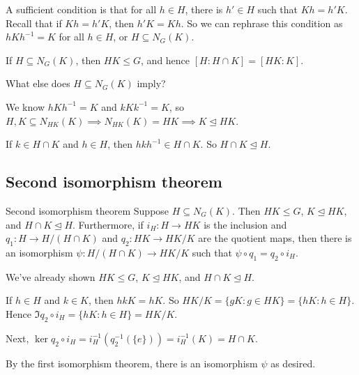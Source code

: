 \documentclass[12pt,letterpaper]{report}
\begin{document}
A sufficient condition is that for all $h \in H$, there is $h' \in H$ such that $Kh = h'K$.
Recall that if $Kh = h'K$, then $h'K = Kh$.
So we can rephrase this condition as $hKh^{-1} = K$ for all $h \in H$, or $H \subseteq N_G(K)$.

\begin{cor}{}{}
  If $H \subseteq N_G(K)$, then $HK \leq G$, and hence $[H : H \cap K] = [HK : K]$.
\end{cor}

What else does $H \subseteq N_G(K)$ imply?

We know $hKh^{-1} = K$ and $kKk^{-1} = K$, so
$H, K \subseteq N_{HK}(K) \implies N_{HK}(K) = HK \implies K \trianglelefteq HK$.

If $k \in H \cap K$ and $h \in H$, then $hkh^{-1} \in H \cap K$.
So $H \cap K \trianglelefteq H$.

\pagebreak
\subsection{Second isomorphism theorem}

\begin{thm}{Second isomorphism theorem}{}
  Suppose $H \subseteq N_G(K)$.
  Then $HK \leq G$, $K \trianglelefteq HK$, and $H \cap K \trianglelefteq H$.
  Furthermore, if $i_H \colon H \to HK$ is the inclusion and $q_1 \colon H \to H/(H \cap K)$ and
  $q_2 \colon HK \to HK/K$ are the quotient maps, then there is an isomorphism
  $\psi \colon H/(H \cap K) \to HK/K$ such that $\psi \circ q_1 = q_2 \circ i_H$.
\end{thm}

\begin{center}
\end{center}

\begin{thmproof}
  We've already shown $HK \leq G$, $K \trianglelefteq HK$, and $H \cap K \trianglelefteq H$.

  If $h \in H$ and $k \in K$, then $hkK = hK$.
  So $HK/K = \{gK : g \in HK\} = \{hK : h \in H\}$.
  Hence $\Im q_2 \circ i_H = \{hK : h \in H\} = HK/K$.

  Next, $\ker q_2 \circ i_H = i_H^{-1}(q_2^{-1}(\{e\})) = i_H^{-1}(K) = H \cap K$.

  By the first isomorphism theorem, there is an isomorphism $\psi$ as desired.
\end{thmproof}
\end{document}
